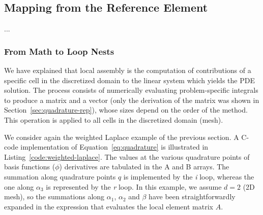 %

\subsection{Mapping from the Reference Element}
\label{sec:bkg:mapping}
...




\subsubsection{From Math to Loop Nests}
\label{sec:bkg:mathcode}
We have explained that local assembly is the computation of contributions of a specific cell in the discretized domain to the linear system which yields the PDE solution. The process consists of numerically evaluating problem-specific integrals to produce a matrix and a vector (only the derivation of the matrix was shown in Section~\ref{sec:quadrature-rep}), whose sizes depend on the order of the method. This operation is applied to all cells in the discretized domain (mesh).

We consider again the weighted Laplace example of the previous section. A C-code implementation of Equation~\ref{eq:quadrature} is illustrated in Listing~\ref{code:weighted-laplace}. The values at the various quadrature points of basis functions ($\phi$) derivatives are tabulated in the A and B arrays. The summation along quadrature points $q$ is implemented by the \emph{i} loop, whereas the one along $\alpha_3$ is represented by the \emph{r} loop. In this example, we assume $d=2$ (2D mesh), so the summations along $\alpha_1$, $\alpha_2$ and $\beta$ have been straightforwardly expanded in the expression that evaluates the local element matrix $A$. 

